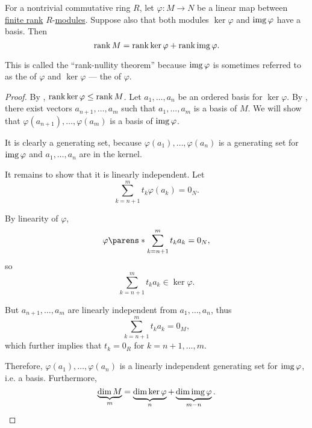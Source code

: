 \begin{theorem}\label{thm:rank_nullity_theorem}
  For a nontrivial commutative ring \( R \), let \( \varphi: M \to N \) be a linear map between \hyperref[thm:commutative_module_rank]{finite rank} \( R \)-\hyperref[def:modules]{modules}. Suppose also that both modules \( \ker \varphi \) and \( \operatorname{img} \varphi \) have a basis. Then
  \begin{equation*}
    \operatorname{rank} M = \operatorname{rank} \ker \varphi + \operatorname{rank} \operatorname{img} \varphi.
  \end{equation*}

  This is called the \enquote{rank-nullity theorem} because \( \operatorname{img} \varphi \) is sometimes referred to as the  of \( \varphi \) and \( \ker \varphi \) --- the  of \( \varphi \).
\end{theorem}
\begin{proof}
  By , \( \operatorname{rank} \ker \varphi \leq \operatorname{rank} M \). Let \( a_1, \ldots, a_n \) be an ordered basis for \( \ker \varphi \). By , there exist vectors \( a_{n+1}, \ldots, a_m \) such that \( a_1, \ldots, a_m \) is a basis of \( M \). We will show that \( \varphi(a_{n+1}), \ldots, \varphi(a_m) \) is a basis of \( \operatorname{img} \varphi \).

  It is clearly a generating set, because \( \varphi(a_1), \ldots, \varphi(a_n) \) is a generating set for \( \operatorname{img} \varphi \) and \( a_1, \ldots, a_n \) are in the kernel.

  It remains to show that it is linearly independent. Let
  \begin{equation*}
    \sum_{k={n+1}}^m t_k \varphi(a_k) = 0_N.
  \end{equation*}

  By linearity of \( \varphi \),
  \begin{equation*}
    \varphi\parens*{ \sum_{k={n+1}}^m t_k a_k } = 0_N,
  \end{equation*}
  so
  \begin{equation*}
    \sum_{k={n+1}}^m t_k a_k \in \ker \varphi.
  \end{equation*}

  But \( a_{n+1}, \ldots, a_m \) are linearly independent from \( a_1, \ldots, a_n \), thus
  \begin{equation*}
    \sum_{k={n+1}}^m t_k a_k = 0_M,
  \end{equation*}
  which further implies that \( t_k = 0_R \) for \( k = n + 1, \ldots, m \).

  Therefore, \( \varphi(a_1), \ldots, \varphi(a_n) \) is a linearly independent generating set for \( \operatorname{img} \varphi \), i.e. a basis. Furthermore,
  \begin{equation*}
    \underbrace{\dim M}_m = \underbrace{\dim \ker \varphi}_n + \underbrace{\dim \operatorname{img} \varphi}_{m - n}.
  \end{equation*}
\end{proof}

